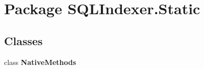 \hypertarget{namespace_s_q_l_indexer_1_1_static}{\section{Package S\-Q\-L\-Indexer.\-Static}
\label{namespace_s_q_l_indexer_1_1_static}
}
\subsection*{Classes}
\begin{DoxyCompactItemize}
\item 
class {\bfseries Native\-Methods}
\end{DoxyCompactItemize}
